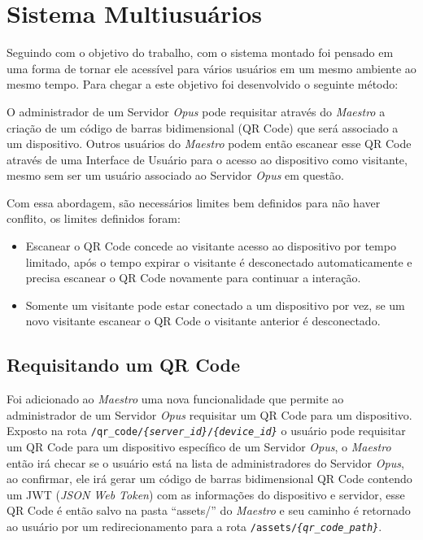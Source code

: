 \chapter{Sistema Multiusuários}
\label{chap:multiusuarios}

Seguindo com o objetivo do trabalho, com o sistema montado foi pensado em uma forma de tornar ele acessível para vários usuários em um mesmo ambiente
ao mesmo tempo. Para chegar a este objetivo foi desenvolvido o seguinte método:

O administrador de um Servidor \emph{Opus} pode requisitar através do \emph{Maestro} a criação de um código de barras bidimensional (QR Code) que será associado 
a um dispositivo. Outros usuários do \emph{Maestro} podem então escanear esse QR Code através de uma Interface de Usuário para o acesso ao dispositivo como 
visitante, mesmo sem ser um usuário associado ao Servidor \emph{Opus} em questão.

Com essa abordagem, são necessários limites bem definidos para não haver conflito, os limites definidos foram:
\begin{itemize}
    \item Escanear o QR Code concede ao visitante acesso ao dispositivo por tempo limitado, após o tempo expirar o visitante é desconectado automaticamente
        e precisa escanear o QR Code novamente para continuar a interação.
    \item Somente um visitante pode estar conectado a um dispositivo por vez, se um novo visitante escanear o QR Code o visitante anterior é desconectado.
\end{itemize}

\section{Requisitando um QR Code}
\label{sec:requisitando_qr_code}

Foi adicionado ao \emph{Maestro} uma nova funcionalidade que permite ao administrador de um Servidor \emph{Opus} requisitar um QR Code para um dispositivo.
Exposto na rota \texttt{/qr\_code/\emph{\{server\_id\}}/\emph{\{device\_id\}}} o usuário pode requisitar um QR Code para um dispositivo específico de um Servidor \emph{Opus},
o \emph{Maestro} então irá checar se o usuário está na lista de administradores do Servidor \emph{Opus}, ao confirmar, ele irá gerar um código de barras 
bidimensional QR Code contendo um JWT (\emph{JSON Web Token}) com as informações do dispositivo e servidor, esse QR Code é então salvo na pasta ``assets/''
do \emph{Maestro} e seu caminho é retornado ao usuário por um redirecionamento para a rota \texttt{/assets/\emph{\{qr\_code\_path\}}}.

